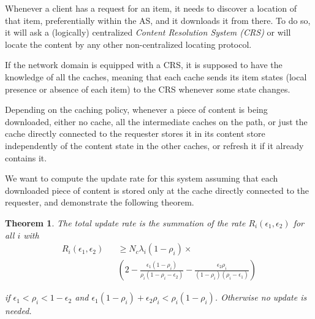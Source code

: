 \documentclass[conference]{IEEEtran}
\theoremstyle{plain}
\newtheorem{theorem}{Theorem}
\theoremstyle{remark}
\begin{document}
Whenever a client has a request for an item, it needs to discover a location of that item, preferentially within the AS, and it downloads it from there. To do so, it will ask a (logically) centralized \emph{Content Resolution System (CRS)} or will locate the content by any other non-centralized locating protocol.

If the network domain is equipped with a CRS, it is supposed to have the knowledge of all the caches, meaning that each cache sends its item states (local presence or absence of each item) to the CRS whenever some state changes. 

Depending on the caching policy, whenever a piece of content is being downloaded, either no cache, all the intermediate caches on the path, or just the cache directly connected to the requester stores it in its content store independently of the content state in the other caches, or refresh it if it already contains it.

We want to compute the update rate for this system assuming that each downloaded piece of content is stored only at the cache directly connected to the requester, and demonstrate the following theorem.

\begin{theorem}\label{thm:1}
The total update rate is the summation of the rate $R_{i}(\epsilon_1,\epsilon_2)$ for all $i$ with
\begin{eqnarray}
   R_{i}(\epsilon_1,\epsilon_2)&&\geq N_c\lambda_i (1-\rho_i) \times \label{eq:ri}\\
	&&(2-\frac{\epsilon_1(1-\rho_i)}{\rho_i(1-\rho_i-\epsilon_2)}-\frac{\epsilon_2 \rho_i}{(1-\rho_i)(\rho_i-\epsilon_1)}) \nonumber
\end{eqnarray}

if $\epsilon_1 < \rho_i < 1-\epsilon_2$ and $\epsilon_1 (1-\rho_i)+\epsilon_2 \rho_i < \rho_i(1-\rho_i)$. Otherwise no update is needed.
\end{theorem}
\end{document}

